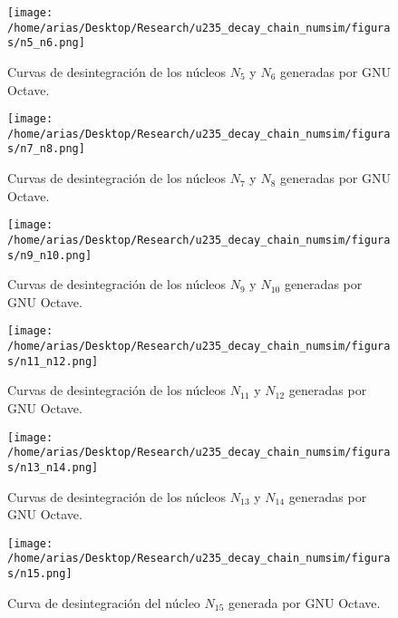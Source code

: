\begin{figure}[H]
	\centering
	\texttt{[image: /home/arias/Desktop/Research/u235\_decay\_chain\_numsim/figuras/n5\_n6.png]}\label{n5n6}\caption{Curvas de desintegración de los núcleos $N_5$ y $N_6$ generadas por GNU Octave.}
\end{figure}

\begin{figure}[H]
	\centering
	\texttt{[image: /home/arias/Desktop/Research/u235\_decay\_chain\_numsim/figuras/n7\_n8.png]}\label{n3n4}\caption{Curvas de desintegración de los núcleos $N_7$ y $N_8$ generadas por GNU Octave.}
\end{figure}

\begin{figure}[H]
	\centering
	\texttt{[image: /home/arias/Desktop/Research/u235\_decay\_chain\_numsim/figuras/n9\_n10.png]}\label{n3n4}\caption{Curvas de desintegración de los núcleos $N_9$ y $N_{10}$ generadas por GNU Octave.}
\end{figure}

\begin{figure}[H]
	\centering
	\texttt{[image: /home/arias/Desktop/Research/u235\_decay\_chain\_numsim/figuras/n11\_n12.png]}\label{n3n4}\caption{Curvas de desintegración de los núcleos $N_{11}$ y $N_{12}$ generadas por GNU Octave.}
\end{figure}

\begin{figure}[H]
	\centering
	\texttt{[image: /home/arias/Desktop/Research/u235\_decay\_chain\_numsim/figuras/n13\_n14.png]}\label{n3n4}\caption{Curvas de desintegración de los núcleos $N_{13}$ y $N_{14}$ generadas por GNU Octave.}
\end{figure}

\begin{figure}[H]
	\centering
	\texttt{[image: /home/arias/Desktop/Research/u235\_decay\_chain\_numsim/figuras/n15.png]}\label{n15}\caption{Curva de desintegración del núcleo $N_{15}$ generada por GNU Octave.}
\end{figure}